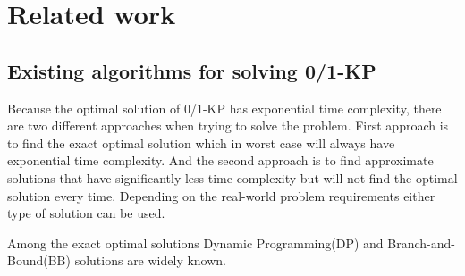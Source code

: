 \section{Related work}
\label{sec:related}

\subsection{Existing algorithms for solving 0/1-KP}
Because the optimal solution of 0/1-KP has exponential time complexity, there
are two different approaches when trying to solve the problem. First approach
is to find the exact optimal solution which in worst case will always have
exponential time complexity. And the second approach is to find approximate
solutions that have significantly less time-complexity but will not find the
optimal solution every time. Depending on the real-world problem requirements
either type of solution can be used.

Among the exact optimal solutions Dynamic Programming(DP) and
Branch-and-Bound(BB) solutions are widely known.

